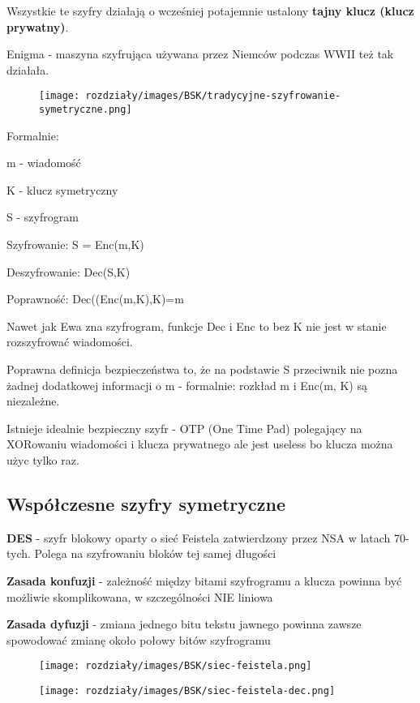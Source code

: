 Wszystkie te szyfry działają o wcześniej potajemnie ustalony \textbf{tajny klucz (klucz prywatny)}.

Enigma - maszyna szyfrująca używana przez Niemców podczas WWII też tak działała.

\begin{figure}[H]
    \centering
    \texttt{[image: rozdziały/images/BSK/tradycyjne-szyfrowanie-symetryczne.png]}
\end{figure}

Formalnie:

m - wiadomość

K - klucz symetryczny

S - szyfrogram

Szyfrowanie: S = Enc(m,K)

Deszyfrowanie: Dec(S,K)

Poprawność: Dec((Enc(m,K),K)=m

Nawet jak Ewa zna szyfrogram, funkcje Dec i Enc to bez K nie jest w stanie rozszyfrować wiadomości.

Poprawna definicja bezpieczeństwa to, że na podstawie S przeciwnik nie pozna żadnej dodatkowej informacji o m - formalnie: rozkład m i Enc(m, K) są niezależne.

Istnieje idealnie bezpieczny szyfr - OTP (One Time Pad) polegający na XORowaniu wiadomości i klucza prywatnego ale jest useless bo klucza można użyc tylko raz.

\subsection{Współczesne szyfry symetryczne}

\textbf{DES} - szyfr blokowy oparty o sieć Feistela zatwierdzony przez NSA w latach 70-tych. Polega na szyfrowaniu bloków tej samej długości

\textbf{Zasada konfuzji} - zależność między bitami szyfrogramu a klucza powinna być
możliwie skomplikowana, w szczególności NIE liniowa

\textbf{Zasada dyfuzji} - zmiana jednego bitu tekstu jawnego powinna zawsze
spowodować zmianę około połowy bitów szyfrogramu


\begin{figure}[H]
    \centering
    \texttt{[image: rozdziały/images/BSK/siec-feistela.png]}
\end{figure}

\begin{figure}[H]
    \centering
    \texttt{[image: rozdziały/images/BSK/siec-feistela-dec.png]}
\end{figure}

